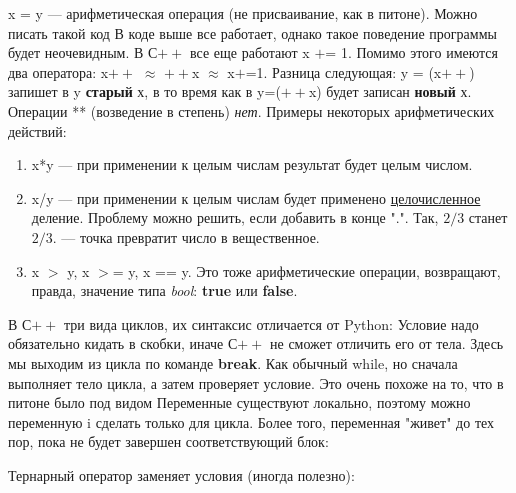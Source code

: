 \begin{lecture}[\lectureSubject]
\begin{lecSection}[Синтаксис]
	\end{lecSection}
	\begin{lecSection}
		x = y --- арифметическая операция (не присваивание, как в питоне). Можно писать такой код
		В коде выше все работает, однако такое поведение программы будет неочевидным.
		В С$++$ все еще работают x $+$= 1. Помимо этого имеются два оператора: x$++$ $\approx$ $++$x $\approx$ x$+$=1.
		Разница следующая: y = (x$++$) запишет в y \textbf{старый} х, в то время как в y=($++$x) будет записан \textbf{новый} х. Операции ** (возведение в степень) \textit{нет}. Примеры некоторых арифметических действий:
		\begin{enumerate}
			\item x*y --- при применении к целым числам результат будет целым числом.
			\item x/y --- при применении к целым числам будет применено \underline{целочисленное} деление. Проблему можно решить, если добавить в конце ".". Так, $2/3$ станет $2/3.$ --- точка превратит число в вещественное.
			\item x $>$ y, x $>$= y, x == y. Это тоже арифметические операции, возвращают, правда, значение типа \textit{bool}: \textbf{true} или \textbf{false}.
		\end{enumerate}
	\end{lecSection}
	\begin{lecSection}
		В С$++$ три вида циклов, их синтаксис отличается от Python:
			Условие надо обязательно кидать в скобки, иначе С$++$ не сможет отличить его от тела.
			Здесь мы выходим из цикла по команде \textbf{break}.
			Как обычный while, но сначала выполняет тело цикла, а затем проверяет условие.
			Это очень похоже на то, что в питоне было под видом
			Переменные существуют локально, поэтому можно переменную i сделать только для цикла. Более того, переменная "живет" до тех пор, пока не будет завершен соответствующий блок:
	\end{lecSection}
	\begin{lecSection}
		Тернарный оператор заменяет условия (иногда полезно):

\end{lecSection}
\end{lecture}
